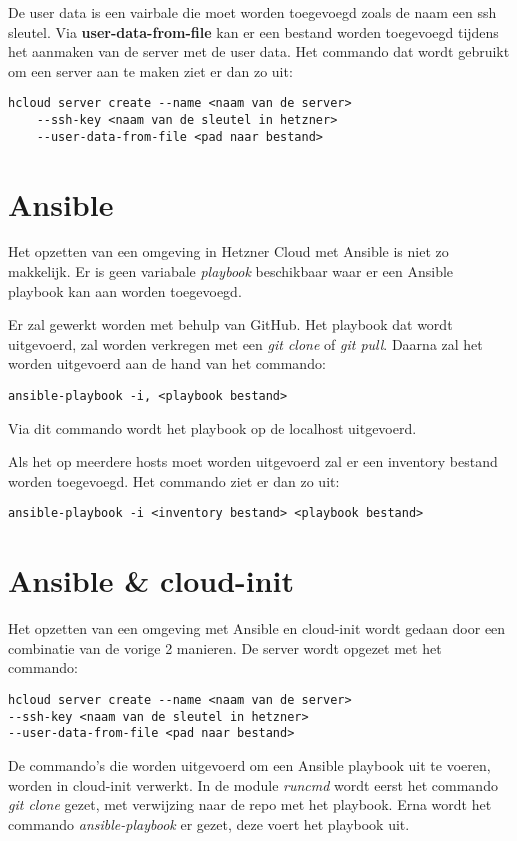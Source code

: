 De user data is een vairbale die moet worden toegevoegd zoals de naam een ssh sleutel. Via \textbf{user-data-from-file} kan er een bestand worden toegevoegd tijdens het aanmaken van de server met de user data. Het commando dat wordt gebruikt om een server aan te maken ziet er dan zo uit:
\begin{lstlisting}[basicstyle=\small]
hcloud server create --name <naam van de server> 
    --ssh-key <naam van de sleutel in hetzner>
    --user-data-from-file <pad naar bestand>
\end{lstlisting}

\section{Ansible}
Het opzetten van een omgeving in Hetzner Cloud met Ansible is niet zo makkelijk. Er is geen variabale \textit{playbook} beschikbaar waar er een Ansible playbook kan aan worden toegevoegd.

Er zal gewerkt worden met behulp van GitHub. Het playbook dat wordt uitgevoerd, zal worden verkregen met een \textit{git clone} of \textit{git pull}. Daarna zal het worden uitgevoerd aan de hand van het commando:
\begin{lstlisting}[basicstyle=\small]
ansible-playbook -i, <playbook bestand>
\end{lstlisting}
Via dit commando wordt het playbook op de localhost uitgevoerd. 

Als het op meerdere hosts moet worden uitgevoerd zal er een inventory bestand worden toegevoegd. Het commando ziet er dan zo uit:
\begin{lstlisting}[basicstyle=\small]
ansible-playbook -i <inventory bestand> <playbook bestand>
\end{lstlisting}

\newpage
\section{Ansible \& cloud-init}
Het opzetten van een omgeving met Ansible en cloud-init wordt gedaan door een combinatie van de vorige 2 manieren. De server wordt opgezet met het commando:
\begin{lstlisting}[basicstyle=\small]
hcloud server create --name <naam van de server> 
--ssh-key <naam van de sleutel in hetzner>
--user-data-from-file <pad naar bestand>
\end{lstlisting}
De commando's die worden uitgevoerd om een Ansible playbook uit te voeren, worden in cloud-init verwerkt. In de module \textit{runcmd} wordt eerst het commando \textit{git clone} gezet, met verwijzing naar de repo met het playbook. Erna wordt het commando \textit{ansible-playbook} er gezet, deze voert het playbook uit.

